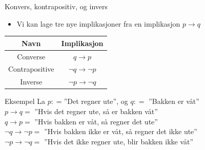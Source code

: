 \begin{frame}{Konvers, kontrapositiv, og invers}
    \begin{itemize}
        \item Vi kan lage tre nye implikasjoner fra en implikasjon $p \rightarrow q$\\
    \end{itemize}
    \pause
    \begin{center}
        \begin{tabular}{c|c}
            Navn & Implikasjon \\ \hline
            Converse & $q \rightarrow p$ \\
            Contrapositive & $\lnot q \rightarrow \lnot p$ \\
            Inverse & $\lnot p \rightarrow \lnot q$ \\
        \end{tabular}
    \end{center}
    \begin{block}{Eksempel}
        La $p : = $''Det regner ute'', og $q : = $ ''Bakken er våt''\\
        $p \rightarrow q = $ ''Hvis det regner ute, så er bakken våt''\\
        $q \rightarrow p = $ ''Hvis bakken er våt, så regner det ute''\\
        $\lnot q \rightarrow \lnot p = $ ''Hvis bakken ikke er våt, så regner det ikke ute''\\
        $\lnot p \rightarrow \lnot q = $ ''Hvis det ikke regner ute, blir bakken ikke våt''\\
    \end{block}
\end{frame}

